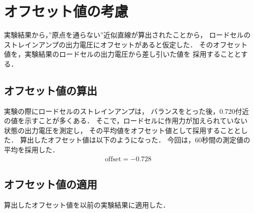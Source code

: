 \documentclass[twocolumn,a4j]{jsarticle}
\begin{document}
\newpage


\section{オフセット値の考慮}
実験結果から，”原点を通らない”近似直線が算出されたことから，
ロードセルのストレインアンプの出力電圧にオフセットがあると仮定した．
そのオフセット値を，実験結果のロードセルの出力電圧から差し引いた値を
採用することとする．

\subsection{オフセット値の算出}
実験の際にロードセルのストレインアンプは，
バランスをとった後，0.720付近の値を示すことが多くある．
そこで，ロードセルに作用力が加えられていない状態の出力電圧を測定し，
その平均値をオフセット値として採用することとした．
算出したオフセット値は以下のようになった．
今回は，60秒間の測定値の平均を採用した．
\begin{eqnarray*}
    \mathrm{offset} = -0.728
\end{eqnarray*}


\subsection{オフセット値の適用}
算出したオフセット値を以前の実験結果に適用した．\\
\end{document}
